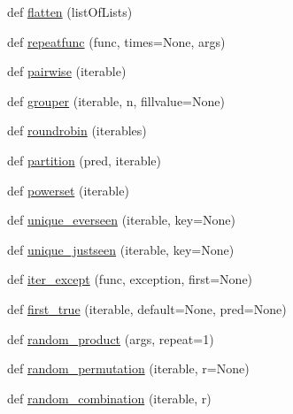 \begin{DoxyCompactItemize}
\item 
def \hyperlink{namespacesetuptools_1_1__vendor_1_1more__itertools_1_1recipes_a4dd6b39b88df1a34e8bf76d98cce13f6}{flatten} (list\+Of\+Lists)
\item 
def \hyperlink{namespacesetuptools_1_1__vendor_1_1more__itertools_1_1recipes_ac5871d6a4c82f4c8d65972fef54eed42}{repeatfunc} (func, times=None, args)
\item 
def \hyperlink{namespacesetuptools_1_1__vendor_1_1more__itertools_1_1recipes_abf4c735370446f73988dabd8407db8d8}{pairwise} (iterable)
\item 
def \hyperlink{namespacesetuptools_1_1__vendor_1_1more__itertools_1_1recipes_a27f1353d86370c730f6aa45b61f725f9}{grouper} (iterable, n, fillvalue=None)
\item 
def \hyperlink{namespacesetuptools_1_1__vendor_1_1more__itertools_1_1recipes_ad561efee19ae73f0805e342a6a9888b3}{roundrobin} (iterables)
\item 
def \hyperlink{namespacesetuptools_1_1__vendor_1_1more__itertools_1_1recipes_ab7db4ae0d779310052eb81556166fbe1}{partition} (pred, iterable)
\item 
def \hyperlink{namespacesetuptools_1_1__vendor_1_1more__itertools_1_1recipes_a3e0a127ba8d18f436377208d4659a2d0}{powerset} (iterable)
\item 
def \hyperlink{namespacesetuptools_1_1__vendor_1_1more__itertools_1_1recipes_a979b0b0dfbe18c669f394aa38cb3053f}{unique\+\_\+everseen} (iterable, key=None)
\item 
def \hyperlink{namespacesetuptools_1_1__vendor_1_1more__itertools_1_1recipes_adfcd7d1a1b8a89c782405d2616a64c9b}{unique\+\_\+justseen} (iterable, key=None)
\item 
def \hyperlink{namespacesetuptools_1_1__vendor_1_1more__itertools_1_1recipes_acea9faafcad6fb77aaabd5244d001985}{iter\+\_\+except} (func, exception, first=None)
\item 
def \hyperlink{namespacesetuptools_1_1__vendor_1_1more__itertools_1_1recipes_a6112b560601bc07e91087a61ff014842}{first\+\_\+true} (iterable, default=None, pred=None)
\item 
def \hyperlink{namespacesetuptools_1_1__vendor_1_1more__itertools_1_1recipes_ac8db4041850a189df0a357e37c1b023e}{random\+\_\+product} (args, repeat=1)
\item 
def \hyperlink{namespacesetuptools_1_1__vendor_1_1more__itertools_1_1recipes_a4ede505cfa74065398181cbfd6c3a3fa}{random\+\_\+permutation} (iterable, r=None)
\item 
def \hyperlink{namespacesetuptools_1_1__vendor_1_1more__itertools_1_1recipes_a84bf2dc121358001d3d4aaa1feb21f10}{random\+\_\+combination} (iterable, r)

\end{DoxyCompactItemize}
